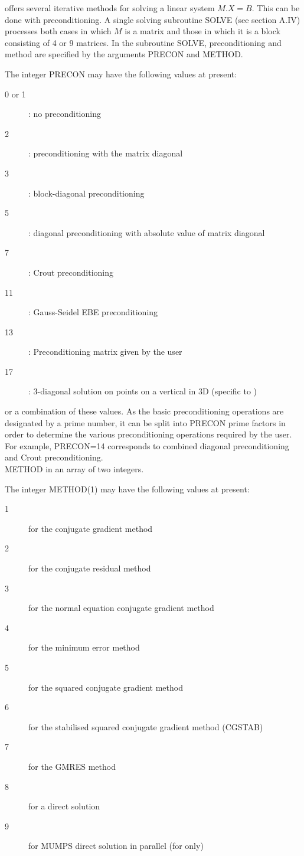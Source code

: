 \bief offers several iterative methods for solving a linear system $M.X = B$.
This can be done with preconditioning. A single solving subroutine SOLVE (see
section A.IV) processes both cases in which $M$ is a matrix and those in which it
is a block consisting of 4 or 9 matrices. In the subroutine SOLVE,
preconditioning and method are specified by the arguments PRECON and METHOD.

The integer PRECON may have the following values at present:

\begin{description}
  \item [0 or 1]: no preconditioning

  \item [2]: preconditioning with the matrix diagonal
  \item [3]: block-diagonal preconditioning
  \item [5]: diagonal preconditioning with absolute value of matrix diagonal
  \item [7]: Crout preconditioning
  \item [11]: Gauss-Seidel EBE preconditioning
  \item [13]: Preconditioning matrix given by the user
  \item [17]: 3-diagonal solution on points on a vertical in 3D (specific to
    )
\end{description}

or a combination of these values. As the basic preconditioning operations are
designated by a prime number, it can be split into PRECON prime factors in
order to determine the various preconditioning operations required by the user.
For example, PRECON=14 corresponds to combined diagonal preconditioning and
Crout preconditioning.\\

METHOD in an array of two integers.

The integer METHOD(1) may have the following values at present:
\begin{description}
  \item [1] for the conjugate gradient method
  \item [2] for the conjugate residual method
  \item [3] for the normal equation conjugate gradient method
  \item [4] for the minimum error method
  \item [5] for the squared conjugate gradient method
  \item [6] for the stabilised squared conjugate gradient method (CGSTAB)
  \item [7] for the GMRES method
  \item [8] for a direct solution
  \item [9] for MUMPS direct solution in parallel (for \artemis only)
\end{description}

